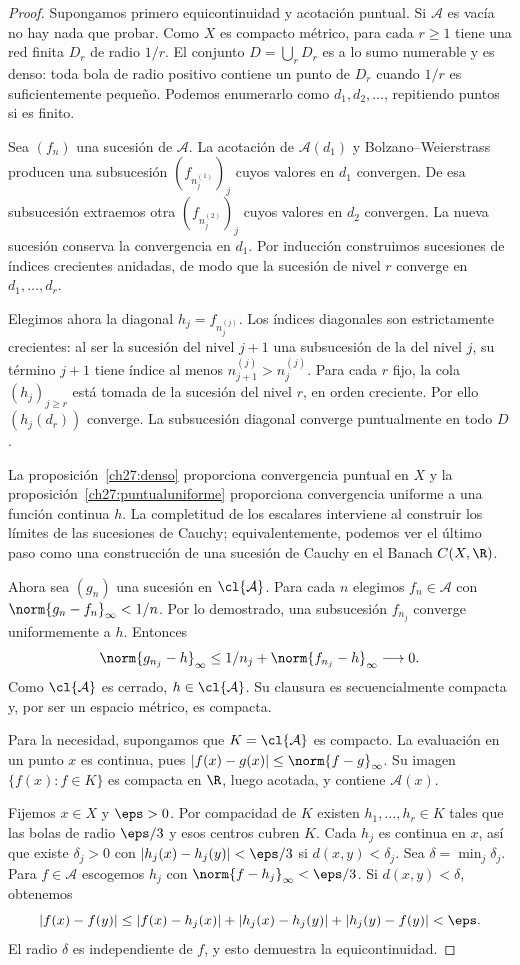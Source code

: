 \begin{proof}
Supongamos primero equicontinuidad y acotación puntual. Si $\mathcal A$ es vacía no hay nada que probar. Como $X$ es compacto métrico, para cada $r\ge1$ tiene una red finita $D_r$ de radio $1/r$. El conjunto $D=\bigcup_rD_r$ es a lo sumo numerable y es denso: toda bola de radio positivo contiene un punto de $D_r$ cuando $1/r$ es suficientemente pequeño. Podemos enumerarlo como $d_1,d_2,\ldots$, repitiendo puntos si es finito.

Sea $(f_n)$ una sucesión de $\mathcal A$. La acotación de $\mathcal A(d_1)$ y Bolzano--Weierstrass producen una subsucesión $(f_{n^{(1)}_j})_j$ cuyos valores en $d_1$ convergen. De esa subsucesión extraemos otra $(f_{n^{(2)}_j})_j$ cuyos valores en $d_2$ convergen. La nueva sucesión conserva la convergencia en $d_1$. Por inducción construimos sucesiones de índices crecientes anidadas, de modo que la sucesión de nivel $r$ converge en $d_1,\ldots,d_r$.

Elegimos ahora la diagonal $h_j=f_{n^{(j)}_j}$. Los índices diagonales son estrictamente crecientes: al ser la sucesión del nivel $j+1$ una subsucesión de la del nivel $j$, su término $j+1$ tiene índice al menos $n^{(j)}_{j+1}>n^{(j)}_j$. Para cada $r$ fijo, la cola $(h_j)_{j\ge r}$ está tomada de la sucesión del nivel $r$, en orden creciente. Por ello $(h_j(d_r))$ converge. La subsucesión diagonal converge puntualmente en todo $D$.

La proposición~\ref{ch27:denso} proporciona convergencia puntual en $X$ y la proposición~\ref{ch27:puntualuniforme} proporciona convergencia uniforme a una función continua $h$. La completitud de los escalares interviene al construir los límites de las sucesiones de Cauchy; equivalentemente, podemos ver el último paso como una construcción de una sucesión de Cauchy en el Banach $C(X,\R)$.

Ahora sea $(g_n)$ una sucesión en $\cl{\mathcal A}$. Para cada $n$ elegimos $f_n\in\mathcal A$ con $\norm{g_n-f_n}_\infty<1/n$. Por lo demostrado, una subsucesión $f_{n_j}$ converge uniformemente a $h$. Entonces
\[
 \norm{g_{n_j}-h}_\infty
 \le1/n_j+\norm{f_{n_j}-h}_\infty\longrightarrow0.
\]
Como $\cl{\mathcal A}$ es cerrado, $h\in\cl{\mathcal A}$. Su clausura es secuencialmente compacta y, por ser un espacio métrico, es compacta.

Para la necesidad, supongamos que $K=\cl{\mathcal A}$ es compacto. La evaluación en un punto $x$ es continua, pues $|f(x)-g(x)|\le\norm{f-g}_\infty$. Su imagen $\{f(x):f\in K\}$ es compacta en $\R$, luego acotada, y contiene $\mathcal A(x)$.

Fijemos $x\in X$ y $\eps>0$. Por compacidad de $K$ existen $h_1,\ldots,h_r\in K$ tales que las bolas de radio $\eps/3$ y esos centros cubren $K$. Cada $h_j$ es continua en $x$, así que existe $\delta_j>0$ con $|h_j(x)-h_j(y)|<\eps/3$ si $d(x,y)<\delta_j$. Sea $\delta=\min_j\delta_j$. Para $f\in\mathcal A$ escogemos $h_j$ con $\norm{f-h_j}_\infty<\eps/3$. Si $d(x,y)<\delta$, obtenemos
\[
 |f(x)-f(y)|
 \le |f(x)-h_j(x)|+|h_j(x)-h_j(y)|+|h_j(y)-f(y)|<\eps.
\]
El radio $\delta$ es independiente de $f$, y esto demuestra la equicontinuidad.
\end{proof}

